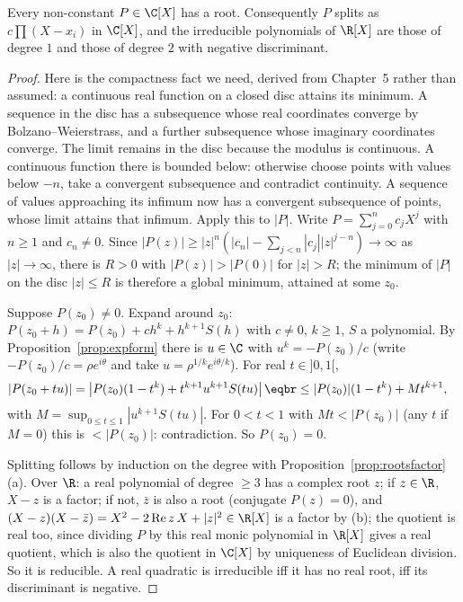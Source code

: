 \begin{theorem}\label{thm:dalembert}
Every non-constant $P\in\C[X]$ has a root. Consequently $P$ splits as $c\prod(X-x_i)$ in $\C[X]$, and the irreducible polynomials of $\R[X]$ are those of degree $1$ and those of degree $2$ with negative discriminant.
\end{theorem}
\begin{proof}
Here is the compactness fact we need, derived from Chapter~5 rather than assumed: a continuous real function on a closed disc attains its minimum. A sequence in the disc has a subsequence whose real coordinates converge by Bolzano--Weierstrass, and a further subsequence whose imaginary coordinates converge. The limit remains in the disc because the modulus is continuous. A continuous function there is bounded below: otherwise choose points with values below $-n$, take a convergent subsequence and contradict continuity. A sequence of values approaching its infimum now has a convergent subsequence of points, whose limit attains that infimum. Apply this to $|P|$.
Write $P=\sum_{j=0}^nc_jX^j$ with $n\ge1$ and $c_n\ne0$.
Since $|P(z)|\ge|z|^n\left(|c_n|-\sum_{j<n}|c_j||z|^{j-n}\right)\to\infty$ as $|z|\to\infty$, there is $R>0$ with $|P(z)|>|P(0)|$ for $|z|>R$; the minimum of $|P|$ on the disc $|z|\le R$ is therefore a global minimum, attained at some $z_0$.

Suppose $P(z_0)\ne0$. Expand around $z_0$: $P(z_0+h)=P(z_0)+ch^k+h^{k+1}S(h)$ with $c\ne0$, $k\ge1$, $S$ a polynomial. By Proposition~\ref{prop:expform} there is $u\in\C$ with $u^k=-P(z_0)/c$ (write $-P(z_0)/c=\rho e^{i\theta}$ and take $u=\rho^{1/k}e^{i\theta/k}$). For real $t\in]0,1[$,
\[
\begin{aligned}|P(z_0+tu)|&=\left|P(z_0)(1-t^k)+t^{k+1}u^{k+1}S(tu)\right|\eqbr\le|P(z_0)|(1-t^k)+Mt^{k+1},\end{aligned}
\]
with $M=\sup_{0\le t\le1}|u^{k+1}S(tu)|$. For $0<t<1$ with $Mt<|P(z_0)|$ (any $t$ if $M=0$) this is $<|P(z_0)|$: contradiction. So $P(z_0)=0$.

Splitting follows by induction on the degree with Proposition~\ref{prop:rootsfactor}(a). Over $\R$: a real polynomial of degree $\ge3$ has a complex root $z$; if $z\in\R$, $X-z$ is a factor; if not, $\bar z$ is also a root (conjugate $P(z)=0$), and $(X-z)(X-\bar z)=X^2-2\operatorname{Re}z\,X+|z|^2\in\R[X]$ is a factor by (b); the quotient is real too, since dividing $P$ by this real monic polynomial in $\R[X]$ gives a real quotient, which is also the quotient in $\C[X]$ by uniqueness of Euclidean division. So it is reducible. A real quadratic is irreducible iff it has no real root, iff its discriminant is negative.
\end{proof}

